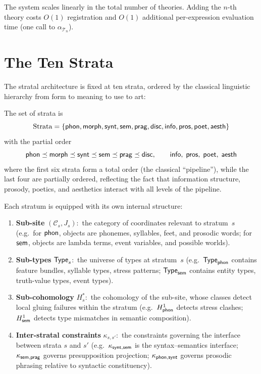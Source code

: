 \begin{corollary}[Scalability]
\label{cor:scalability}
The system scales linearly in the total number of theories.  Adding
the $n$-th theory costs $O(1)$ registration and $O(1)$ additional
per-expression evaluation time (one call to $\alpha_{\mathcal{T}_n}$).
\end{corollary}

\section{The Ten Strata}
\label{sec:ten-strata}

The stratal architecture is fixed at ten strata, ordered by the
classical linguistic hierarchy from form to meaning to use to art:

\begin{definition}[Strata]
\label{def:strata}
The set of strata is
\[
  \mathrm{Strata} = \{\mathsf{phon}, \mathsf{morph}, \mathsf{synt}, \mathsf{sem}, \mathsf{prag}, \mathsf{disc},
  \mathsf{info}, \mathsf{pros}, \mathsf{poet}, \mathsf{aesth}\}
\]
with the partial order
\[
  \mathsf{phon} \preceq \mathsf{morph} \preceq \mathsf{synt} \preceq \mathsf{sem} \preceq \mathsf{prag}
  \preceq \mathsf{disc}, \qquad
  \mathsf{info},\; \mathsf{pros},\; \mathsf{poet},\; \mathsf{aesth}
\]
where the first six strata form a total order (the classical
``pipeline''), while the last four are partially ordered, reflecting
the fact that information structure, prosody, poetics, and aesthetics
interact with all levels of the pipeline.
\end{definition}

Each stratum is equipped with its own internal structure:

\begin{enumerate}[label=(\arabic*)]
\item \textbf{Sub-site} $(\mathcal{C}_s, J_s)$:\ the category of
  coordinates relevant to stratum~$s$ (e.g.\ for $\mathsf{phon}$, objects
  are phonemes, syllables, feet, and prosodic words; for $\mathsf{sem}$,
  objects are lambda terms, event variables, and possible worlds).

\item \textbf{Sub-types} $\mathsf{Type}_s$:\ the universe of types at
  stratum~$s$ (e.g.\ $\mathsf{Type}_{\mathsf{phon}}$ contains feature bundles,
  syllable types, stress patterns; $\mathsf{Type}_{\mathsf{sem}}$ contains entity
  types, truth-value types, event types).

\item \textbf{Sub-cohomology} $H^*_s$:\ the cohomology of the
  sub-site, whose classes detect local gluing failures within the
  stratum (e.g.\ $H^1_{\mathsf{phon}}$ detects stress clashes;
  $H^1_{\mathsf{sem}}$ detects type mismatches in semantic composition).

\item \textbf{Inter-stratal constraints} $\kappa_{s,s'}$:\ the
  constraints governing the interface between strata $s$ and $s'$
  (e.g.\ $\kappa_{\mathsf{synt},\mathsf{sem}}$ is the syntax--semantics interface;
  $\kappa_{\mathsf{sem},\mathsf{prag}}$ governs presupposition projection;
  $\kappa_{\mathsf{phon},\mathsf{synt}}$ governs prosodic phrasing relative to
  syntactic constituency).
\end{enumerate}

